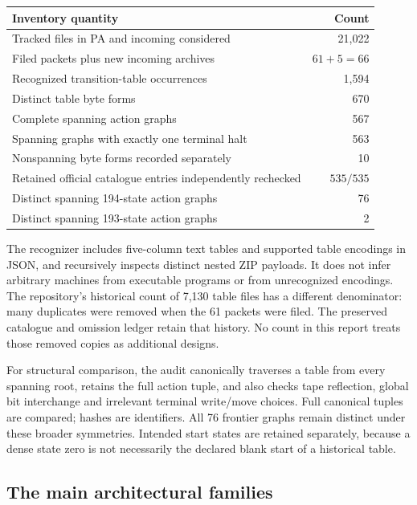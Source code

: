 \documentclass[11pt]{article}
\theoremstyle{definition}\newtheorem{definition}[theorem]{Definition}
\begin{document}
\begin{center}
\begin{tabular}{@{}lr@{}}
\toprule
Inventory quantity & Count\\
\midrule
Tracked files in PA and incoming considered & 21,022\\
Filed packets plus new incoming archives & $61+5=66$\\
Recognized transition-table occurrences & 1,594\\
Distinct table byte forms & 670\\
Complete spanning action graphs & 567\\
Spanning graphs with exactly one terminal halt & 563\\
Nonspanning byte forms recorded separately & 10\\
Retained official catalogue entries independently rechecked & $535/535$\\
Distinct spanning 194-state action graphs & 76\\
Distinct spanning 193-state action graphs & 2\\
\bottomrule
\end{tabular}
\end{center}

The recognizer includes five-column text tables and supported table
encodings in JSON, and recursively inspects distinct nested ZIP payloads.
It does not infer arbitrary machines from executable programs or from
unrecognized encodings. The repository's historical count of 7,130 table
files has a different denominator: many duplicates were removed when the
61 packets were filed. The preserved catalogue and omission ledger retain
that history. No count in this report treats those removed copies as
additional designs.

For structural comparison, the audit canonically traverses a table from
every spanning root, retains the full action tuple, and also checks tape
reflection, global bit interchange and irrelevant terminal write/move
choices. Full canonical tuples are compared; hashes are identifiers.
All 76 frontier graphs remain distinct under these broader symmetries.
Intended start states are retained separately, because a dense state zero
is not necessarily the declared blank start of a historical table.

\subsection{The main architectural families}
\end{document}
